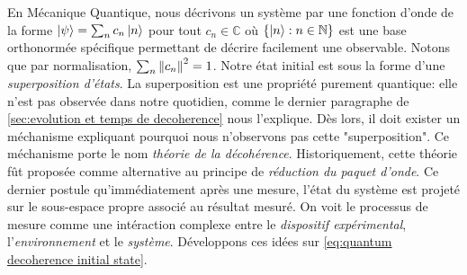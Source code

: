 \documentclass[11pt,oneside,a4paper]{article}
\begin{document}
En Mécanique Quantique, nous décrivons un système par une fonction d'onde de la forme $\ket{\psi} = \sum_n c_n\ket{n}$ pour tout $c_n\in\mathbb{C}$ où $\left\{\ket{n} : n\in\mathbb{N}\right\}$ est une base orthonormée spécifique permettant de décrire facilement une observable. Notons que par normalisation, $\sum_n \norm{c_n}^2 = 1$. Notre état initial est sous la forme d'une \emph{superposition d'états}. La superposition est une propriété purement quantique: elle n'est pas observée dans notre quotidien, comme le dernier paragraphe de \ref{sec:evolution et temps de decoherence} nous l'explique. Dès lors, il doit exister un méchanisme expliquant pourquoi nous n'observons pas cette "superposition". Ce méchanisme porte le nom \emph{théorie de la décohérence}. Historiquement, cette théorie fût proposée comme alternative au principe de \emph{réduction du paquet d'onde}. Ce dernier postule qu'immédiatement après une mesure, l'état du système est projeté sur le sous-espace propre associé au résultat mesuré. On voit le processus de mesure comme une intéraction complexe entre le \emph{dispositif expérimental}, l'\emph{environnement} et le \emph{système}. Développons ces idées sur \eqref{eq:quantum decoherence initial state}.\\
\end{document}
